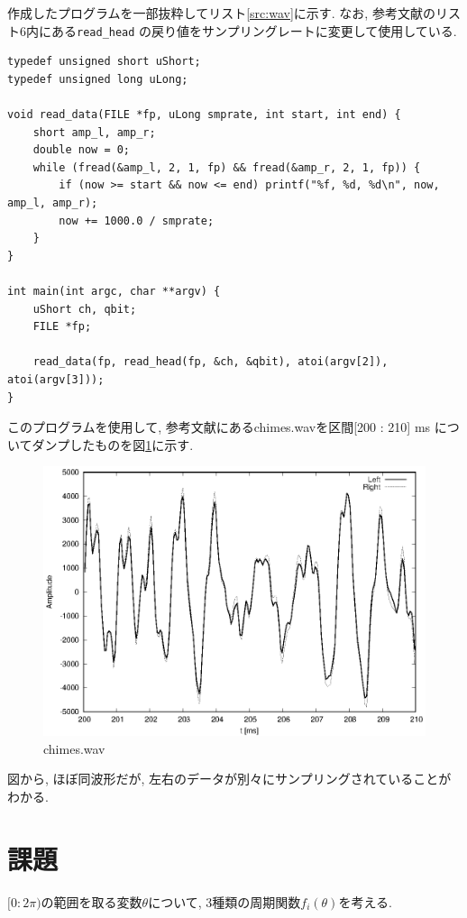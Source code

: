 \documentclass[titlepage]{jsarticle}
\begin{document}
        作成したプログラムを一部抜粋してリスト\ref{src:wav}に示す. なお, 参考文献\cite{Text}のリスト6内にある\verb|read_head|
        の戻り値をサンプリングレートに変更して使用している.

        \begin{lstlisting}[caption=wav2txt-s16.c, label=src:wav]
typedef unsigned short uShort;
typedef unsigned long uLong;

void read_data(FILE *fp, uLong smprate, int start, int end) {
    short amp_l, amp_r;
    double now = 0;
    while (fread(&amp_l, 2, 1, fp) && fread(&amp_r, 2, 1, fp)) {
        if (now >= start && now <= end) printf("%f, %d, %d\n", now, amp_l, amp_r);
        now += 1000.0 / smprate;
    }
}

int main(int argc, char **argv) {
    uShort ch, qbit;
    FILE *fp;
    
    read_data(fp, read_head(fp, &ch, &qbit), atoi(argv[2]), atoi(argv[3]));
}\end{lstlisting}
        
        このプログラムを使用して, 参考文献\cite{Support Page}にあるchimes.wavを区間[200 : 210] ms
        についてダンプしたものを図\ref{fig:wav}に示す.

        \begin{figure}[h]
            \centering
            \includegraphics[width=0.8\hsize]{images/chimes.eps}
            \caption{chimes.wav}
            \label{fig:wav}
        \end{figure}

        図から, ほぼ同波形だが, 左右のデータが別々にサンプリングされていることがわかる.

\section{課題}
    $[0:2\pi)$の範囲を取る変数$\theta$について, 3種類の周期関数$f_i(\theta)$を考える.
\end{document}
